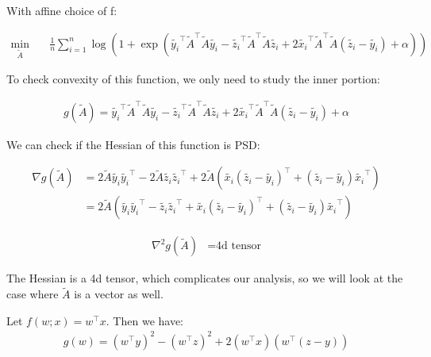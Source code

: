 \documentclass[11pt]{article}
\begin{document}
With affine choice of f:

\begin{equation}
\label{eq:smooth_problem}
\begin{aligned}
    \min_{\tilde{A}} \quad & \frac{1}{n} \sum_{i=1}^{n} \log{(1 + \exp{(\tilde{y_i}^\top\tilde{A}^\top\tilde{A}\tilde{y_i} - \tilde{z_i}^\top\tilde{A}^\top\tilde{A}\tilde{z_i} + 2\tilde{x_i}^\top\tilde{A}^\top\tilde{A}(\tilde{z_i} - \tilde{y_i}) + \alpha)})}
\end{aligned}
\end{equation}

To check convexity of this function, we only need to study the inner portion:

\begin{equation}
\begin{aligned}
g(\tilde{A}) = \tilde{y_i}^\top\tilde{A}^\top\tilde{A}\tilde{y_i} - \tilde{z_i}^\top\tilde{A}^\top\tilde{A}\tilde{z_i} + 2\tilde{x_i}^\top\tilde{A}^\top\tilde{A}(\tilde{z_i} - \tilde{y_i}) + \alpha
\end{aligned}
\end{equation}

We can check if the Hessian of this function is PSD:

\begin{align*}
\nabla{g(\tilde{A})}
&= 2\tilde{A}\tilde{y_i}\tilde{y_i}^\top - 2\tilde{A}\tilde{z_i}\tilde{z_i}^\top + 2\tilde{A}(\tilde{x_i}(\tilde{z_i} - \tilde{y_i})^\top + (\tilde{z_i} - \tilde{y_i})\tilde{x_i}^\top) \\
&= 2\tilde{A}(\tilde{y_i}\tilde{y_i}^\top - \tilde{z_i}\tilde{z_i}^\top + \tilde{x_i}(\tilde{z_i} - \tilde{y_i})^\top + (\tilde{z_i} - \tilde{y_i})\tilde{x_i}^\top)
\end{align*}

\begin{equation}
\begin{aligned}
\nabla^2 g(\tilde{A})
&= \textrm{4d tensor}
\end{aligned}
\end{equation}

The Hessian is a 4d tensor, which complicates our analysis, so we will look at the case where $\tilde{A}$ is a vector as well. 

Let $f(w; x) = w^{\top}x$. Then we have:
\begin{equation}
\begin{aligned}
g(w) = (w^{\top}y)^2 - (w^{\top}z)^2 + 2(w^{\top}x)(w^{\top}(z - y))
\end{aligned}
\end{equation}
\end{document}
